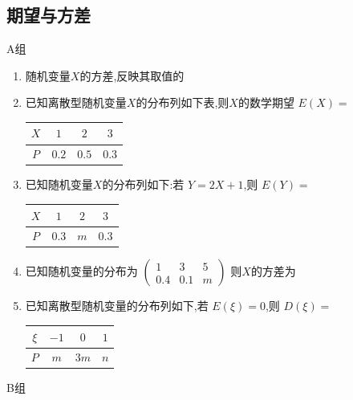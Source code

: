 \clearpage


\subsection*{期望与方差}


A组

\begin{enumerate}
\item 随机变量$X$的方差,反映其取值的

\item 已知离散型随机变量$X$的分布列如下表,则$X$的数学期望 $E(X)=$
\begin{center}
\begin{tabular}{|c|c|c|c|}
\hline
$X$ & $1$ & $2$ & $3$ \\
\hline
$P$ & $0.2$ & $0.5$ & $0.3$ \\
\hline
\end{tabular}
\end{center}

\item 已知随机变量$X$的分布列如下:若 $Y=2X+1$,则 $E(Y)=$
\begin{center}
\begin{tabular}{|c|c|c|c|}
\hline
$X$ & $1$ & $2$ & $3$ \\
\hline
$P$ & $0.3$ & $m$ & $0.3$ \\
\hline
\end{tabular}
\end{center}

\item 已知随机变量的分布为 $\begin{pmatrix}1&3&5\\ 0.4&0.1&m\end{pmatrix}$ 则$X$的方差为

\item 已知离散型随机变量的分布列如下,若 $E(\xi)=0$,则 $D(\xi)=$
\begin{center}
\begin{tabular}{|c|c|c|c|}
\hline
$\xi$ & $-1$ & $0$ & $1$ \\
\hline
$P$ & $m$ & $3m$ & $n$ \\
\hline
\end{tabular}
\end{center}

\end{enumerate}


B组

